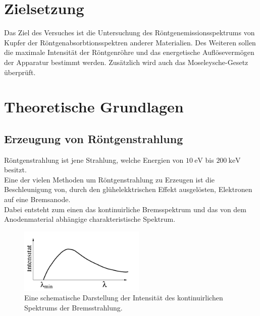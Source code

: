 \newpage
\section{Zielsetzung}
    Das Ziel des Versuches ist die Untersuchung des Röntgenemissionsspektrums  von Kupfer der
    Röntgenabsorbtionsspektren anderer Materialien. Des Weiteren sollen die maximale Intensität der Röntgenröhre und das energetische Auflösevermögen der Apparatur bestimmt werden.
    Zusätzlich wird auch das Moseleysche-Gesetz überprüft.

\section{Theoretische Grundlagen }

\subsection{Erzeugung von Röntgenstrahlung}

Röntgenstrahlung ist jene Strahlung, welche Energien von $\SI{10}{\eV}$ bis $\SI{200}{\kilo\eV}$ besitzt.\\
Eine der vielen Methoden um Röntgenstrahlung zu Erzeugen ist die Beschleunigung von, durch den glühelekktrischen Effekt ausgelösten, Elektronen auf eine Bremsanode.\\
Dabei entsteht zum einen das kontinuirliche Bremsspektrum und das  von dem Anodenmaterial abhängige charakteristische Spektrum.\\
\begin{figure}
    \centering
    \includegraphics[width=6cm]{latex/images/kurve1.PNG}
    \caption{Eine schematische Darstellung der Intensität des kontinuirlichen Spektrums der Bremsstrahlung\protect \cite{V602}.}
    \label{img:comp}
\end{figure}

